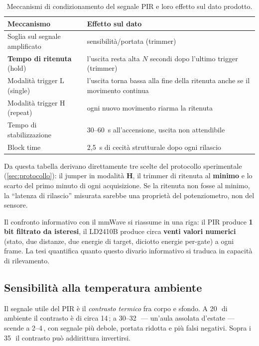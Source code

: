 \begin{table}[htbp]
\centering
\caption{Meccanismi di condizionamento del segnale PIR e loro effetto sul dato
prodotto.}
\label{tab:pir-meccanismi}
\small
\begin{tabularx}{\linewidth}{@{}lX@{}}
\toprule
\textbf{Meccanismo} & \textbf{Effetto sul dato} \\
\midrule
Soglia sul segnale amplificato & sensibilità/portata (trimmer) \\
\textbf{Tempo di ritenuta} (hold) & l'uscita resta alta $N$ secondi dopo l'ultimo
  trigger (trimmer) \\
Modalità trigger L (single) & l'uscita torna bassa alla fine della ritenuta anche
  se il movimento continua \\
Modalità trigger H (repeat) & ogni nuovo movimento riarma la ritenuta \\
Tempo di stabilizzazione & 30--60~s all'accensione, uscita non attendibile \\
Block time & 2,5~s di cecità strutturale dopo ogni rilascio \\
\bottomrule
\end{tabularx}
\end{table}

Da questa tabella derivano direttamente tre scelte del protocollo sperimentale
(\cref{sec:protocollo}): il jumper in modalità \textbf{H}, il trimmer di ritenuta
al \textbf{minimo} e lo scarto del primo minuto di ogni acquisizione. Se la
ritenuta non fosse al minimo, la ``latenza di rilascio'' misurata sarebbe una
proprietà del potenziometro, non del sensore.

Il confronto informativo con il mmWave si riassume in una riga: il PIR produce
\textbf{1 bit filtrato da isteresi}, il LD2410B produce circa \textbf{venti valori
numerici} (stato, due distanze, due energie di target, diciotto energie per-gate) a
ogni frame. La tesi quantifica quanto questo divario informativo si traduca in
capacità di rilevamento.

\subsection{Sensibilità alla temperatura ambiente}
\label{sec:pir-temperatura}

Il segnale utile del PIR è il \emph{contrasto termico} fra corpo e sfondo. A
20\,\celsius\ di ambiente il contrasto è di circa 14\,\celsius; a
30--32\,\celsius\ --- un'aula assolata d'estate --- scende a 2--4\,\celsius, con
segnale più debole, portata ridotta e più falsi negativi. Sopra i 35\,\celsius\ il
contrasto può addirittura invertirsi.

